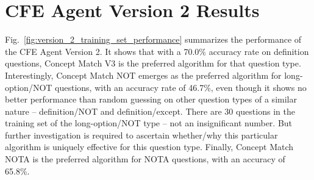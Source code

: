 
\begin{table}[h!]
\centering
\caption{Concept Match NOTA vs. Max Frequency Hypothesis Test on Definition/NOTA  Questions}
\small
{}
\label{table:concept_match_nota_hypothesis_test}
\end{table}




\section{CFE Agent Version 2 Results}

Fig.~\ref{fig:version_2_training_set_performance} summarizes the performance of the CFE Agent Version 2.  It shows that with a 70.0\% accuracy rate on definition questions, Concept Match V3 is the preferred algorithm for that question type.  Interestingly, Concept Match NOT emerges as the preferred algorithm for long-option/NOT questions, with an accuracy rate of 46.7\%, even though it shows no better performance than random guessing on other question types of a similar nature -- definition/NOT  and definition/except.  There are 30 questions in the training set of the long-option/NOT type -- not an insignificant number.  But further investigation is required to ascertain whether/why this particular algorithm is uniquely effective for this question type.  Finally, Concept Match NOTA is the preferred algorithm for NOTA questions, with an accuracy of 65.8\%.

